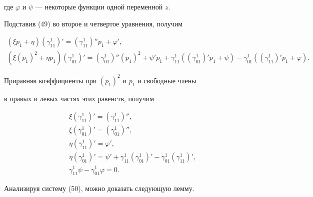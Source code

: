 где $\varphi$ и $\psi$ --- некоторые функции одной переменной $z$.


Подставив (49) во второе и четвертое уравнения, получим


\begin{gather*}


({\xi p_1+\eta}) ({\gamma_{11}^1})'=


({\gamma_{11}^1})'' p_1+\varphi',\\


%


({\xi ({p_1})^2+\eta p_1}) ({\gamma_{01}^1})'=


({\gamma_{01}^1})'' ({p_1})^2+\psi' p_1+


\gamma_{11}^1 ({ ({\gamma_{01}^1})' p_1+\psi})-


\gamma_{01}^1 ({ ({\gamma_{11}^1})' p_1+\varphi}).


\end{gather*} 


 


Приравняв коэффициенты при $(p_1)^2$ и $p_1$ и свободные члены 


в правых и левых частях этих равенств, получим


\begin{equation}


\begin{split}


& \xi ({\gamma_{11}^1})' = ({\gamma_{11}^1})'', \\


& \xi ({\gamma_{01}^1})' = ({\gamma_{01}^1})'', \\


& \eta ({\gamma_{11}^1})' =\varphi', \\


& \eta ({\gamma_{01}^1})' =\psi'+\gamma_{11}^1


({\gamma_{01}^1})'-\gamma_{01}^1 ({\gamma_{11}^1})', \\


& \gamma_{11}^1 \psi-\gamma_{01}^1 \varphi =0.


\end{split} 


\end{equation}


Анализируя систему (50), можно доказать следующую лемму.





